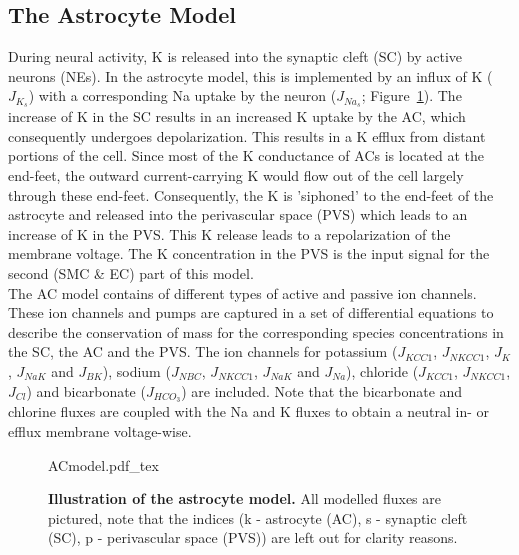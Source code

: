 \subsection{The Astrocyte Model}
During neural activity, \gls{K} is released into the synaptic cleft (SC) by active neurons (NEs). In the astrocyte model, this is implemented by an influx of \gls{K} ($J_{K_s}$) with a corresponding \gls{Na} uptake by the neuron ($ J_{Na_s} $; Figure~\ref{fig:ACmodel}).
The increase of \gls{K} in the SC results in an increased \gls{K} uptake by the \gls{AC}, which consequently undergoes depolarization. This results in a \gls{K} efflux from distant portions of the cell. Since most of the \gls{K} conductance of \gls{AC}s is located at the end-feet, the outward current-carrying \gls{K} would flow out of the cell largely through these end-feet. Consequently, the \gls{K} is 'siphoned' to the end-feet of the astrocyte and released into the perivascular space (\gls{PVS}) which leads to an increase of \gls{K} in the PVS. This \gls{K} release leads to a repolarization of the membrane voltage. The \gls{K} concentration in the \gls{PVS} is the input signal for the second (SMC \& EC) part of this model. \\
The AC model contains of different types of active and passive ion channels. These ion channels and pumps are captured in a set of differential equations to describe the conservation of mass for the corresponding species concentrations in the SC, the \gls{AC} and the \gls{PVS}. The ion channels for potassium ($ J_{KCC1}$, $ J_{NKCC1} $, $ J_{K}$, $ J_{NaK} $ and $J_{BK}$), sodium ($ J_{NBC} $, $ J_{NKCC1} $,  $ J_{NaK} $ and  $ J_{Na} $), chloride ($ J_{KCC1}$, $ J_{NKCC1} $, $ J_{Cl} $) and bicarbonate ($ J_{HCO_3}$) are included. Note that the bicarbonate and chlorine fluxes are coupled with the \gls{Na} and \gls{K} fluxes to obtain a neutral in- or efflux membrane voltage-wise.\\

\begin{figure}[h!]
  \centering
  \def\svgwidth{450pt} %
  \scriptsize
  {ACmodel.pdf_tex}
  \caption{\textbf{Illustration of the astrocyte model.} All modelled fluxes are pictured, note that the indices (k - astrocyte (AC), s - synaptic cleft (SC), p - perivascular space (PVS)) are left out for clarity reasons.}
\label{fig:ACmodel}
\end{figure}
\vspace{3cm}

